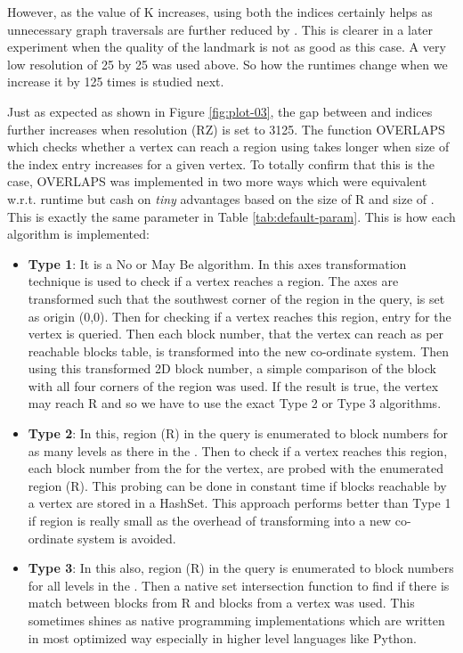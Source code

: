 However, as the value of K increases, using both the indices certainly helps as unnecessary graph traversals are further reduced by {\rrpspatial}. This is clearer in a later experiment when the quality of the landmark is not as good as this case. A very low resolution of 25 by 25 was used above. So how the runtimes change when we increase it by 125 times is studied next.

Just as expected as shown in Figure \ref{fig:plot-03}, the gap between {\rrp} and {\rrpsocial} indices further increases when resolution (RZ) is set to 3125. The function OVERLAPS which checks whether a vertex can reach a region using {\rrpspatial} takes longer when size of the index entry increases for a given vertex. To totally confirm that this is the case, OVERLAPS was implemented in two more ways which were equivalent w.r.t. runtime but cash on \textit{tiny} advantages based on the size of R and size of {\rrpspatial}. This is exactly the same parameter {\vra} in Table \ref{tab:default-param}. This is how each algorithm is implemented:
\begin{itemize}
  \item \textbf{Type 1}: It is a No or May Be algorithm. In this axes transformation technique is used to check if a vertex reaches a region. The axes are transformed such that the southwest corner of the region in the query, is set as origin (0,0). Then for checking if a vertex reaches this region, {\rrpspatial} entry for the vertex is queried. Then each block number, that the vertex can reach as per reachable blocks table, is transformed into the new co-ordinate system. Then using this transformed 2D block number, a simple comparison of the block with all four corners of the region was used. If the result is true, the vertex may reach R and so we have to use the exact Type 2 or Type 3 algorithms.
  \item \textbf{Type 2}: In this, region (R) in the query is enumerated to block numbers for as many levels as there in the {\rrpspatial}. Then to check if a vertex reaches this region, each block number from the {\rrpspatial} for the vertex, are probed with the enumerated region (R). This probing can be done in constant time if blocks reachable by a vertex are stored in a HashSet. This approach performs better than Type 1 if region is really small as the overhead of transforming into a new co-ordinate system is avoided.
  \item \textbf{Type 3}: In this also, region (R) in the query is enumerated to block numbers for all levels in the {\rrpspatial}. Then a native set intersection function to find if there is match between blocks from R and blocks from a vertex was used. This sometimes shines as native programming implementations which are written in most optimized way especially in higher level languages like Python.
\end{itemize}

